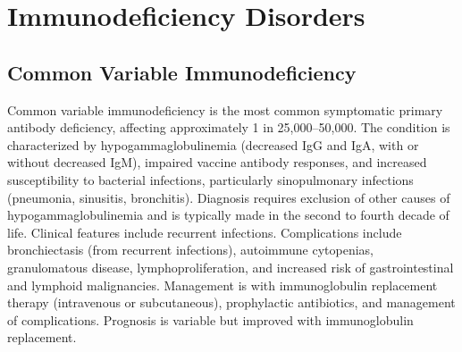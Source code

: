 \section{Immunodeficiency Disorders}








\label{sec:Immunodeficiency Disorders}

\subsection{Common Variable Immunodeficiency}
\label{sec:Common Variable Immunodeficiency}
Common variable immunodeficiency is the most common symptomatic primary antibody deficiency, affecting approximately 1 in 25,000--50,000. The condition is characterized by hypogammaglobulinemia (decreased IgG and IgA, with or without decreased IgM), impaired vaccine antibody responses, and increased susceptibility to bacterial infections, particularly sinopulmonary infections (pneumonia, sinusitis, bronchitis). Diagnosis requires exclusion of other causes of hypogammaglobulinemia and is typically made in the second to fourth decade of life. Clinical features include recurrent infections. Complications include bronchiectasis (from recurrent infections), autoimmune cytopenias, granulomatous disease, lymphoproliferation, and increased risk of gastrointestinal and lymphoid malignancies. Management is with immunoglobulin replacement therapy (intravenous or subcutaneous), prophylactic antibiotics, and management of complications. Prognosis is variable but improved with immunoglobulin replacement.

